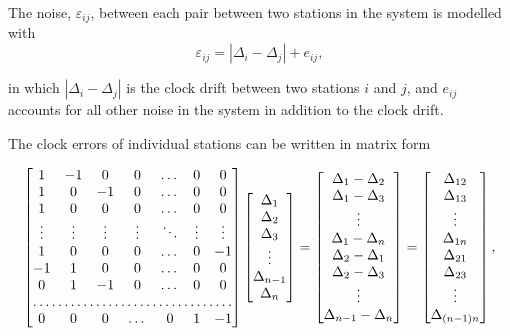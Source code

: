 \documentclass[12pt,a4paper,english]{article}
\begin{document}
The noise, $\varepsilon_{ij}$, between each pair between two stations in the system is modelled with 
\begin{equation}
\varepsilon_{ij} = | \Delta_i - \Delta_j | + e_{ij},
\end{equation}

in which $ | \Delta_i - \Delta_j | $ is the clock drift between two stations $i$ and $j$, and $e_{ij}$ accounts for all other noise in the system in addition to the clock drift. 

The clock errors of individual stations can be written in matrix form 

\begin{equation*}
\begin{bmatrix}
1 & -1 & 0 & 0 & \dots & 0 & 0 \\
1 & 0 & -1 & 0 & \dots & 0 & 0 \\
1 &  0  & 0 & 0 & \dots & 0  & 0 \\
\vdots & \vdots & \vdots & \vdots & \ddots & \vdots & \vdots \\
1 &  0  & 0 & 0 & \dots & 0 & -1 \\
-1 & 1 & 0 & 0 & \dots & 0  & 0 \\
0 & 1 & -1 & 0 & \dots & 0 & 0 \\
\hdotsfor{7} \\
0 & 0 & 0 & \dots & 0& 1 & -1
\end{bmatrix}
 \begin{bmatrix}
\Delta_1 \\ \Delta_2 \\ \Delta_3 \\ \vdots \\ \Delta_{n-1} \\ \Delta_n
\end{bmatrix}
 = 
 \begin{bmatrix}
 \Delta_1 - \Delta_2 \\ \Delta_1-\Delta_3 \\ \vdots \\ \Delta_1 - \Delta_{n} \\ \Delta_2- \Delta_1 \\ \Delta_2 - \Delta_3 \\ \vdots \\ \Delta_{n-1} - \Delta_n
 \end{bmatrix}
= 
\begin{bmatrix}
\Delta_{12} \\ \Delta_{13} \\ \vdots \\ \Delta_{1n} \\ \Delta_{21} \\ \Delta_{23} \\ \vdots \\ \Delta_{(n-1)n}
\end{bmatrix}, 
\end{equation*}
\end{document}
